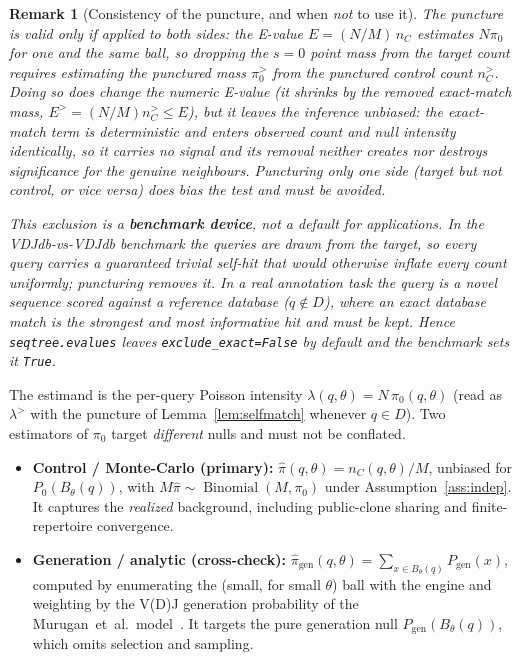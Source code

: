 \documentclass[11pt]{article}
\theoremstyle{oldplain}
\theoremstyle{oldrem}
\newtheorem{remark}{Remark}
\DeclareMathOperator{\Binomial}{Binomial}
\newcommand{\Pgen}{P_{\mathrm{gen}}}
\newcommand{\Pzero}{P_{0}}
\newcommand{\ball}[2]{B_{#1}(#2)}
\begin{document}
\begin{remark}[Consistency of the puncture, and when \emph{not} to use it]\label{rem:punct-app}
The puncture is valid \emph{only if applied to both sides}: the E-value $E=(N/M)\,n_C$ estimates
$N\pi_0$ for one and the same ball, so dropping the $s=0$ point mass from the target count requires
estimating the punctured mass $\pi_0^{>}$ from the \emph{punctured} control count $n_C^{>}$. Doing so
does change the numeric E-value (it shrinks by the removed exact-match mass, $E^{>}=(N/M)n_C^{>}\le
E$), but it leaves the \emph{inference} unbiased: the exact-match term is deterministic and enters
observed count and null intensity identically, so it carries no signal and its removal neither
creates nor destroys significance for the genuine neighbours. Puncturing only one side
(target but not control, or vice versa) \emph{does} bias the test and must be avoided.

This exclusion is a \textbf{benchmark device}, not a default for applications. In the
VDJdb-vs-VDJdb benchmark the queries are drawn from the target, so every query carries a guaranteed
trivial self-hit that would otherwise inflate every count uniformly; puncturing removes it. In a real
annotation task the query is a \emph{novel} sequence scored against a reference database
($q\notin D$), where an exact database match is the strongest and most informative hit and must be
kept. Hence \texttt{seqtree.evalues} leaves \texttt{exclude\_exact=False} by default and the benchmark
sets it \texttt{True}.
\end{remark}

The estimand is the per-query Poisson intensity $\lambda(q,\theta) = N\,\pi_0(q,\theta)$ (read as
$\lambda^{>}$ with the puncture of Lemma~\ref{lem:selfmatch} whenever $q\in D$). Two
estimators of $\pi_0$ target \emph{different} nulls and must not be conflated.
\begin{itemize}
  \item \textbf{Control / Monte-Carlo (primary):} $\hat\pi(q,\theta) = n_C(q,\theta)/M$, unbiased
  for $\Pzero(\ball{\theta}{q})$, with $M\hat\pi \sim \Binomial(M,\pi_0)$ under
  Assumption~\ref{ass:indep}. It captures the \emph{realized} background, including public-clone
  sharing and finite-repertoire convergence.
  \item \textbf{Generation / analytic (cross-check):} $\hat\pi_{\mathrm{gen}}(q,\theta) =
  \sum_{x\in\ball{\theta}{q}} \Pgen(x)$, computed by enumerating the (small, for small $\theta$)
  ball with the engine and weighting by the V(D)J generation probability of the Murugan~et~al.\
  model~\cite{Murugan2012}. It targets the pure generation null $\Pgen(\ball{\theta}{q})$, which
  omits selection and sampling.
\end{itemize}
\end{document}
